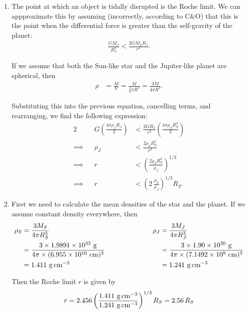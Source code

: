 \documentclass[11pt,letterpaper]{article}
\begin{document}
\begin{enumerate}[label=(\alph*)]
    \item The point at which an object is tidally disrupted is the Roche limit. We can appproximate this by assuming (incorrectly, according to C\&O) that this is the point when the differential force is greater than the self-gravity of the planet: 
        \begin{align*}
            \frac{GM_J}{R_J^2} < \frac{2GM_SR_J}{r^3}.
        \end{align*}

        If we assume that both the Sun-like star and the Jupiter-like planet are spherical, then 
        \begin{align*}
            \rho &= \frac{M}{V} = \frac{M}{\frac{4}{3}\pi R^3} = \frac{3M}{4\pi R^3}.        \end{align*}

        Substituting this into the previous equation, cancelling terms, and rearranging, we find the following expression:
        \begin{alignat*}{2}
            &&G \left(\frac{4\pi\rho_J R_J}{3}\right) &<  \frac{2GR_J}{r^3}\left(\frac{4\pi\rho_S R_S^3}{3}\right) \\
            \implies&& \rho_J &< \frac{2\rho_S R_S^3}{r^3} \\
            \implies&& r &< \left(\frac{2\rho_S R_S^3}{\rho_J}\right)^{1/3} \\
            \implies&& r &< \left(2\,\frac{\rho_S}{\rho_J}\right)^{1/3} R_S.
        \end{alignat*}

    \item First we need to calculate the mean densities of the star and the planet. If we assume constant density everywhere, then 
        \begin{alignat*}{2}
            \rho_S &= \frac{3M_S}{4\pi R_S^3} &\qquad\qquad\qquad \rho_J &= \frac{3M_J}{4\pi R_J^3} \\
                   &= \frac{3\times 1.9891\times 10^{33}~{\rm g}}{4\pi\times (6.955\times 10^{10}~{\rm cm})^3} &&= \frac{3\times 1.90\times 10^{30}~{\rm g}}{4\pi\times (7.1492\times 10^{9}~{\rm cm})^3} \\
                   &= 1.411~{\rm g\,cm^{-3}} &&= 1.241~{\rm g\,cm^{-3}} 
        \end{alignat*}

        Then the Roche limit $r$ is given by 
        \begin{equation*}
            r = 2.456\left(\frac{1.411~{\rm g\,cm^{-3}}}{1.241~{\rm g\,cm^{-3}}}\right)^{1/3} R_S = 2.56\,R_S
        \end{equation*}


\end{enumerate}
\end{document}
